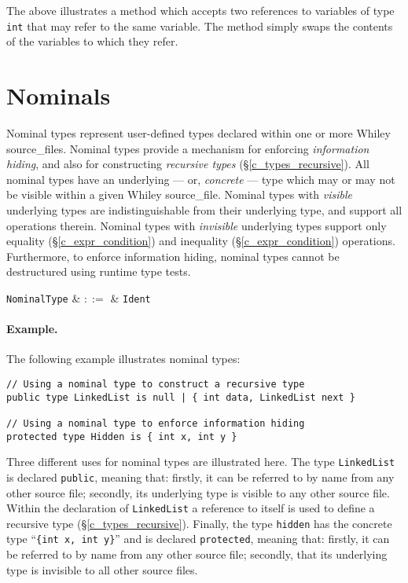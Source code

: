 The above illustrates a method which accepts two references to variables of type \lstinline{int} that may refer to the same variable.  The method simply swaps the contents of the variables to which they refer.


\section{Nominals}
\label{c_types_nominal}

Nominal types represent user-defined types declared within one or more Whiley \gls{source_file}s.  Nominal types provide a mechanism for enforcing {\em information hiding}, and also for constructing {\em recursive types} (\S\ref{c_types_recursive}).  All nominal types have an underlying --- or, {\em concrete} --- type which may or may not be visible within a given Whiley \gls{source_file}.  Nominal types with {\em visible} underlying types are indistinguishable from their underlying type, and support all operations therein.   Nominal types with {\em invisible} underlying types support only equality (\S\ref{c_expr_condition}) and inequality (\S\ref{c_expr_condition}) operations.  Furthermore, to enforce information hiding, nominal types cannot be destructured using runtime type tests.

\begin{syntax}
  \verb+NominalType+ & $::=$ & \verb+Ident+\\
\end{syntax}

\paragraph{Example.} The following example illustrates nominal types:
\begin{lstlisting}
// Using a nominal type to construct a recursive type
public type LinkedList is null | { int data, LinkedList next }

// Using a nominal type to enforce information hiding
protected type Hidden is { int x, int y }
\end{lstlisting}
Three different uses for nominal types are illustrated here.  The type \lstinline{LinkedList} is declared \lstinline{public}, meaning that: firstly, it can be referred to by name from any other source file; secondly, its underlying type is visible to any other source file.  Within the declaration of \lstinline{LinkedList} a reference to itself is used to define a recursive type (\S\ref{c_types_recursive}).  Finally, the type \lstinline{hidden} has the concrete type ``\lstinline|{int x, int y}|'' and is declared \lstinline{protected}, meaning that: firstly, it can be referred to by name from any other source file; secondly,  that its underlying type is invisible to all other source files.

